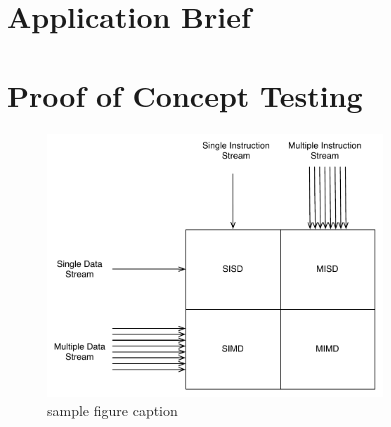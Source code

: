 \section{Application Brief}
\label{sec:section3}

\section{Proof of Concept Testing}
\label{sec:section4}


\begin{figure}[h]
\centering
\includegraphics[width=3.5in]{./Figures/sampleFigureFlynn.pdf}
\caption{sample figure caption}
\label{fig:sampleFigureLabel}
\end{figure}